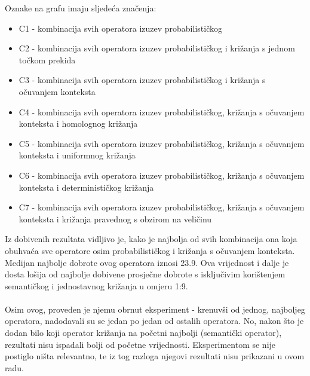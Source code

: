 Oznake na grafu imaju sljedeća značenja:

\begin{itemize}
\item{C1 - kombinacija svih operatora izuzev probabilističkog}
\item{C2 - kombinacija svih operatora izuzev probabilističkog i križanja s jednom točkom prekida}
\item{C3 - kombinacija svih operatora izuzev probabilističkog i križanja s očuvanjem konteksta}
\item{C4 - kombinacija svih operatora izuzev probabilističkog, križanja s očuvanjem konteksta i homolognog križanja}
\item{C5 - kombinacija svih operatora izuzev probabilističkog, križanja s očuvanjem konteksta i uniformnog križanja}
\item{C6 - kombinacija svih operatora izuzev probabilističkog, križanja s očuvanjem konteksta i determinističkog križanja}
\item{C7 - kombinacija svih operatora izuzev probabilističkog, križanja s očuvanjem konteksta i križanja pravednog s obzirom na veličinu}

\end{itemize}


Iz dobivenih rezultata vidljivo je, kako je najbolja od svih kombinacija ona koja obuhvaća sve operatore osim probabilističkog i križanja s očuvanjem konteksta. Medijan najbolje dobrote ovog operatora iznosi 23.9. Ova vrijednost i dalje je dosta lošija od najbolje dobivene prosječne dobrote s isključivim korištenjem semantičkog i jednostavnog križanja u omjeru 1:9.
\\
\\
Osim ovog, proveden je njemu obrnut eksperiment - krenuvši od jednog, najboljeg operatora, nadodavali su se jedan po jedan od ostalih operatora. No, nakon što je dodan bilo koji operator križanja na početni najbolji (semantički operator), rezultati nisu ispadali bolji od početne vrijednosti. Eksperimentom se nije postiglo ništa relevantno, te iz tog razloga njegovi rezultati nisu prikazani u ovom radu.

